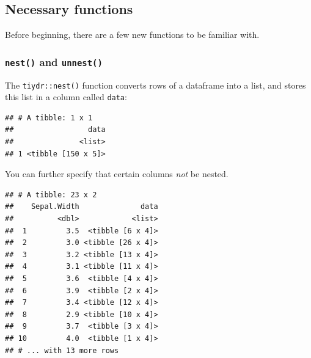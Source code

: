 \documentclass[]{article}
\newenvironment{Shaded}{\begin{snugshade}}{\end{snugshade}}
\newcommand{\KeywordTok}[1]{\textcolor[rgb]{0.13,0.29,0.53}{\textbf{#1}}}
\newcommand{\StringTok}[1]{\textcolor[rgb]{0.31,0.60,0.02}{#1}}
\newcommand{\OperatorTok}[1]{\textcolor[rgb]{0.81,0.36,0.00}{\textbf{#1}}}
\newcommand{\NormalTok}[1]{#1}
\begin{document}
\subsection{Necessary functions}\label{necessary-functions}

Before beginning, there are a few new functions to be familiar with.

\subsubsection{\texorpdfstring{\texttt{nest()} and
\texttt{unnest()}}{nest() and unnest()}}\label{nest-and-unnest}

The \texttt{tiydr::nest()} function converts rows of a dataframe into a
list, and stores this list in a column called \texttt{data}:

\begin{Shaded}
\end{Shaded}

\begin{verbatim}
## # A tibble: 1 x 1
##                 data
##               <list>
## 1 <tibble [150 x 5]>
\end{verbatim}

You can further specify that certain columns \emph{not} be nested.

\begin{Shaded}
\end{Shaded}

\begin{verbatim}
## # A tibble: 23 x 2
##    Sepal.Width              data
##          <dbl>            <list>
##  1         3.5  <tibble [6 x 4]>
##  2         3.0 <tibble [26 x 4]>
##  3         3.2 <tibble [13 x 4]>
##  4         3.1 <tibble [11 x 4]>
##  5         3.6  <tibble [4 x 4]>
##  6         3.9  <tibble [2 x 4]>
##  7         3.4 <tibble [12 x 4]>
##  8         2.9 <tibble [10 x 4]>
##  9         3.7  <tibble [3 x 4]>
## 10         4.0  <tibble [1 x 4]>
## # ... with 13 more rows
\end{verbatim}
\end{document}
